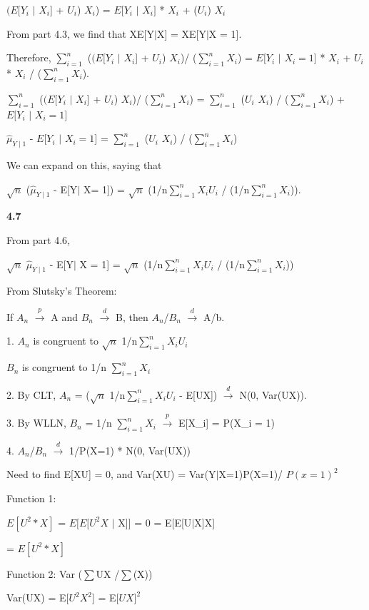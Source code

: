 $(E[Y_{i}$ $\mid$ $X_{i}$] + $U_{i}$) $X_{i}$) =  $E[Y_{i} $ $\mid$ $X_{i}]$ * $X_{i}$ + ($U_{i}$) $X_{i}$ 

From part 4.3, we find that XE[Y$\mid$X] = XE[Y$\mid$X = 1].

Therefore, $\sum^n_{i=1}$ ($(E[Y_{i}$ $\mid$ $X_{i}$] + $U_{i}$) $X_{i}$)/ ($\sum^n_{i=1} X_{i}$) =  $E[Y_{i}$ $\mid$ $X_{i} = 1]$ * $X_{i}$ + $U_{i}$ * $X_{i}$ / ($\sum^n_{i=1} X_{i}$). 

$\sum^n_{i=1}$ ($(E[Y_{i}$ $\mid$ $X_{i}$] + $U_{i}$) $X_{i}$)/ ($\sum^n_{i=1} X_{i}$) = $\sum^n_{i=1}$ ($U_{i}$ $X_{i}$) / ($\sum^n_{i=1} X_{i}$) + $E[Y_{i}$ $\mid$ $X_{i} = 1]$  

$\hat{\mu}_{Y\mid1}$ - $E[Y_{i}$ $\mid$ $X_{i} = 1]$ = $\sum^n_{i=1}$ ($U_{i}$ $X_{i}$) / ($\sum^n_{i=1} X_{i}$)

We can expand on this, saying that 

$\sqrt{n}$ ($\hat{\mu}_{Y\mid1}$ - E[Y$\mid$ X= 1]) = $\sqrt{n}$ (1/n$\sum^n_{i=1} X_{i}U_{i}$ / (1/n$\sum^n_{i=1} X_{i}$)).

\textbf{4.7}

From part 4.6,

$\sqrt{n}$ $\hat{\mu}_{Y\mid1}$ - E[Y$\mid$ X = 1] = $\sqrt{n}$ (1/n$\sum^n_{i=1} X_{i}U_{i}$ / (1/n$\sum^n_{i=1} X_{i}$))

From Slutsky's Theorem:

If $A_{n}$ $\xrightarrow{p}$ A and $B_{n}$ $\xrightarrow{d}$ B, then $A_{n}$/$B_{n}$  $\xrightarrow{d}$ A/b.

1. $A_{n}$ is congruent to $\sqrt{n}$ 1/n$\sum^n_{i=1} X_{i}U_{i}$

 $B_{n}$ is congruent to 1/n $\sum^n_{i=1} X_{i}$

2. By CLT, $A_{n}$ = ($\sqrt{n}$ 1/n$\sum^n_{i=1} X_{i}U_{i}$ - E[UX]) $\xrightarrow{d}$ N(0, Var(UX)).

3. By WLLN, $B_{n}$ = 1/n $\sum^n_{i=1} X_{i}$ $\xrightarrow{p}$ E[X_{i}] = P(X_{i} = 1)

4. $A_{n}$/$B_{n}$ $\xrightarrow{d}$ 1/P(X=1) * N(0, Var(UX))

Need to find E[XU] = 0, and Var(XU) = Var(Y$\mid$X=1)P(X=1)/ $P(x=1)^2$

Function 1: 

$E[U^2 * X]$ = $E[E[U^2 X$ $\mid$ X]] = 0 = E[E[U$\mid$X]X]

= $E[U^2 * X]$

Function 2: Var ($\sum$UX /$\sum$(X))

Var(UX) = E[$U^2 X^2$] = E[$UX]^2$


